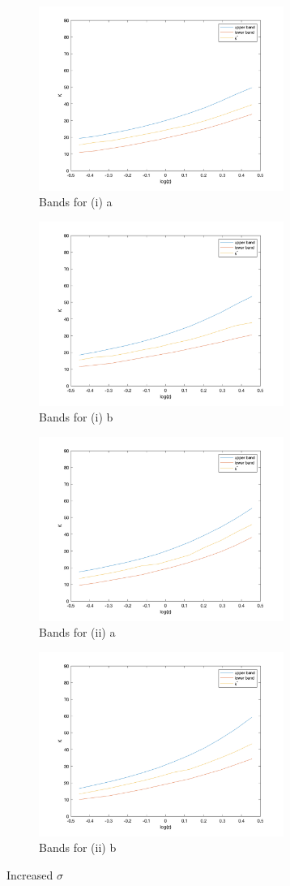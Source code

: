 \documentclass[10pt,letter]{article}
\begin{document}
\begin{center}
\begin{figure}
\begin{subfigure}{.5\textwidth}
\includegraphics[width=8cm]{ps3q2_fig13}
\caption{Bands for (i) a}
\end{subfigure}
\begin{subfigure}{.5\textwidth}
\includegraphics[width=8cm]{ps3q2_fig14}
\caption{Bands for (i) b}
\end{subfigure}
\begin{subfigure}{.5\textwidth}
\includegraphics[width=8cm]{ps3q2_fig15}
\caption{Bands for (ii) a}
\end{subfigure}
\begin{subfigure}{.5\textwidth}
\includegraphics[width=8cm]{ps3q2_fig16}
\caption{Bands for (ii) b}
\end{subfigure}
\caption{Increased $\sigma$}
\end{figure}
\end{center}
\end{document}
